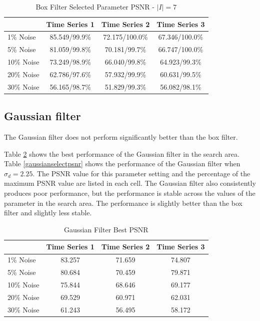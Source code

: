 \documentclass[11pt]{article}
\theoremstyle{definition}
\begin{document}
\begin{table}[!h]
\small
\begin{center}
\begin{tabular}{lccc}
\hline
 & Time Series 1 & Time Series 2 & Time Series 3 \\ \hline
1\% Noise & 85.549/99.9\% & 72.175/100.0\% & 67.346/100.0\% \\ \hline
5\% Noise & 81.059/99.8\% & 70.181/99.7\% & 66.747/100.0\% \\ \hline
10\% Noise & 73.249/98.9\% & 66.040/99.8\% & 64.923/99.3\% \\ \hline
20\% Noise & 62.786/97.6\% & 57.932/99.9\% & 60.631/99.5\% \\ \hline
30\% Noise & 56.165/98.7\% & 51.829/99.3\% & 56.082/98.1\% \\ \hline
\end{tabular}
\caption{Box Filter Selected Parameter PSNR - $\lvert I \rvert = 7$}
\label{boxselectpsnr}
\end{center}
\end{table}

\subsection{Gaussian filter}

The Gaussian filter does not perform significantly better than the box
filter.

Table \ref{gaussianbestpsnr} shows the best performance of the
Gaussian filter in the search area. Table \ref{gaussianselectpsnr}
shows the performance of the Gaussian filter when $\sigma_d = 2.25$.
The PSNR value for this parameter setting and the percentage of the
maximum PSNR value are listed in each cell. The Gaussian filter also
consistently produces poor performance, but the performance is stable
across the values of the parameter in the search area. The performance
is slightly better than the box filter and slightly less stable.

\begin{table}[!h]
\small
\begin{center}
\begin{tabular}{lccc}
\hline
 & Time Series 1 & Time Series 2 & Time Series 3 \\ \hline
1\% Noise & 83.257 & 71.659 & 74.807 \\ \hline
5\% Noise & 80.684 & 70.459 & 79.871 \\ \hline
10\% Noise & 75.844 & 68.646 & 69.177 \\ \hline
20\% Noise & 69.529 & 60.971 & 62.031 \\ \hline
30\% Noise & 61.243 & 56.495 & 58.172 \\ \hline
\end{tabular}
\caption{Gaussian Filter Best PSNR}
\label{gaussianbestpsnr}
\end{center}
\end{table}
\end{document}
